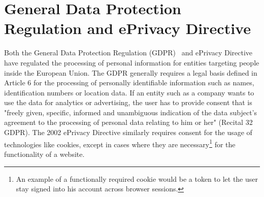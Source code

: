 \section{General Data Protection Regulation and ePrivacy Directive} \label{sec:legal}
Both the General Data Protection Regulation (GDPR)~\cite{gdpr2016} and ePrivacy Directive~\cite{privacydirective2016} have regulated the processing of personal information for entities targeting people inside the European Union.
The GDPR generally requires a legal basis defined in Article 6 for the processing of personally identifiable information such as names, identification numbers or location data.
If an entity such as a company wants to use the data for analytics or advertising, the user has to provide consent that is "freely given, specific, informed and unambiguous indication of the data subject's agreement to the processing of personal data relating to him or her" (Recital 32 GDPR).
The 2002 ePrivacy Directive similarly requires consent for the usage of technologies like cookies, except in cases where they are necessary\footnote{An example of a functionally required cookie would be a token to let the user stay signed into his account across browser sessions.} for the functionality of a website.